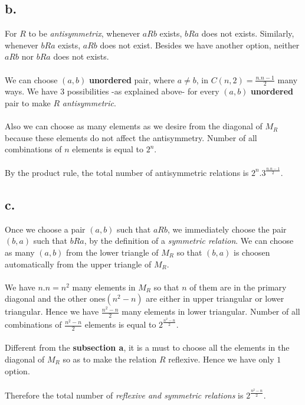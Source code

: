 \documentclass[12pt]{article}
\begin{document}
\subsection*{b.}
For $R$ to be \textit{antisymmetrix}, whenever $aRb$ exists, $bRa$ does not exists. Similarly, whenever $bRa$ exists, $aRb$ does not exist. Besides we have another option, neither $aRb$ nor $bRa$ does not exists.\\ \\
We can choose $(a, b)$ \textbf{unordered} pair, where $a\neq b$, in $C(n, 2)=\frac{n.n-1}{2}$ many ways. We have 3 possibilities -as explained above- for every $(a, b)$ \textbf{unordered} pair to make $R$ \textit{antisymmetric}.\\ \\
Also we can choose as many elements as we desire from the diagonal of $M_R$ because these elements do not affect the antisymmetry. Number of all combinations of $n$ elements is equal to $2^n$.\\ \\
By the product rule, the total number of antisymmetric relations is $2^n.3^{\frac{n.n-1}{2}}$.

\subsection*{c.}

Once we choose a pair $(a, b)$ such that $aRb$, we immediately choose the pair $(b, a)$ such that $bRa$, by the definition of a \textit{symmetric relation}. We can choose as many $(a, b)$ from the lower triangle of $M_R$ so that $(b, a)$ is choosen automatically from the upper triangle of $M_R$.\\ \\
We have $n.n=n^2$ many elements in $M_R$ so that $n$ of them are in the primary diagonal and the other ones$(n^2-n)$ are either in upper triangular or lower triangular. Hence we have $\frac{n^2-n}{2}$ many elements in lower triangular. Number of all combinations of $\frac{n^2-n}{2}$ elements is equal to $2^{\frac{n^2-n}{2}}$.\\ \\
Different from the \textbf{subsection a}, it is a must to choose all the elements in the diagonal of $M_R$ so as to make the relation $R$ reflexive. Hence we have only $1$ option.\\ \\
Therefore the total number of \textit{reflexive and symmetric relations} is $2^{\frac{n^2-n}{2}}$.
\end{document}
